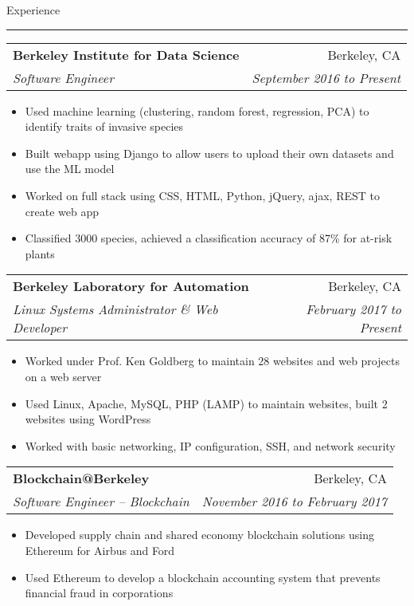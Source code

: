 \documentclass[11pt,letterpaper]{article}
\makeatletter
\newenvironment{topic}[1]
    {
    {\Large \centerline{#1}}
    \vspace*{0.03in}
    \hrule 
    \vspace*{0.05in}
    }
    {}
\newenvironment{event}
    {
    \begin{tabular*}{\textwidth}{l@{\extracolsep{\fill}}r}
    }
    {
    \end{tabular*}
    }
\makeatother
\begin{document}
    \begin{topic}{Experience}
        \begin{event}
            \textbf{Berkeley Institute for Data Science} & Berkeley, CA \\
            \emph{Software Engineer} & \emph{September 2016 to Present} \\
        \end{event}
            \begin{itemize}
                \item Used machine learning (clustering, random forest, regression, PCA) to identify traits of invasive species
                \item Built webapp using Django to allow users to upload their own datasets and use the ML model
                \item Worked on full stack using CSS, HTML, Python, jQuery, ajax, REST to create web app 
                \item Classified 3000 species, achieved a classification accuracy of 87\% for at-risk plants
            \end{itemize}
        \vspace*{0.1in}

        \begin{event}
            \textbf{Berkeley Laboratory for Automation} & Berkeley, CA \\
            \emph{Linux Systems Administrator \& Web Developer} & \emph{February 2017 to Present}
        \end{event}
            \begin{itemize}
                \item Worked under Prof. Ken Goldberg to maintain 28 websites and web projects on a web server
                \item Used Linux, Apache, MySQL, PHP (LAMP) to maintain websites, built 2 websites using WordPress
                \item Worked with basic networking, IP configuration, SSH, and network security
            \end{itemize}
        \vspace*{0.1in}

        \begin{event}
            \textbf{Blockchain@Berkeley} & Berkeley, CA \\
            \emph{Software Engineer -- Blockchain} & \emph{November 2016 to February 2017}
        \end{event}
            \begin{itemize}
                \item Developed supply chain and shared economy blockchain solutions using Ethereum for Airbus and Ford
                \item Used Ethereum to develop a blockchain accounting system that prevents financial fraud in corporations
            \end{itemize}
        
    \end{topic} \vspace*{0.1in}
\end{document}
